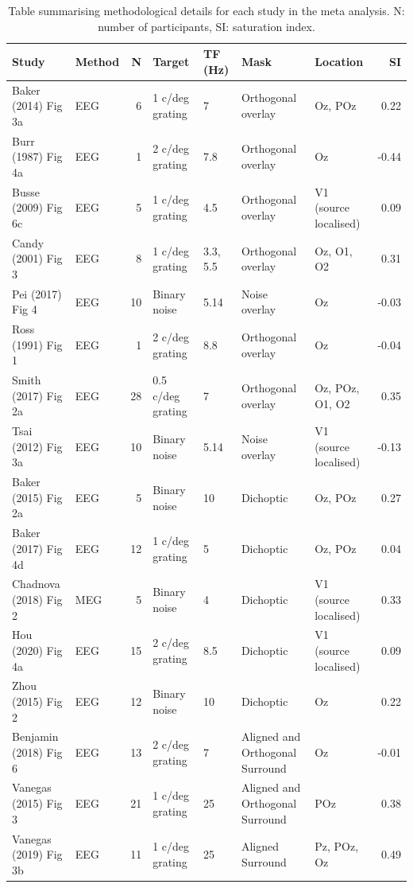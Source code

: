 \documentclass[]{article}
\begin{document}
\begin{table}

\caption{\label{tab:metatable}Table summarising methodological details for each study in the meta analysis. N: number of participants, SI: saturation index.}
\centering
\begin{tabular}[t]{l|l|r|l|l|l|l|r}
\hline
Study & Method & N & Target & TF (Hz) & Mask & Location & SI\\
\hline
Baker (2014) Fig 3a & EEG & 6 & 1 c/deg grating & 7 & Orthogonal overlay & Oz, POz & 0.22\\
\hline
Burr (1987) Fig 4a & EEG & 1 & 2 c/deg grating & 7.8 & Orthogonal overlay & Oz & -0.44\\
\hline
Busse (2009) Fig 6c & EEG & 5 & 1 c/deg grating & 4.5 & Orthogonal overlay & V1 (source localised) & 0.09\\
\hline
Candy (2001) Fig 3 & EEG & 8 & 1 c/deg grating & 3.3, 5.5 & Orthogonal overlay & Oz, O1, O2 & 0.31\\
\hline
Pei (2017) Fig 4 & EEG & 10 & Binary noise & 5.14 & Noise overlay & Oz & -0.03\\
\hline
Ross (1991) Fig 1 & EEG & 1 & 2 c/deg grating & 8.8 & Orthogonal overlay & Oz & -0.04\\
\hline
Smith (2017) Fig 2a & EEG & 28 & 0.5 c/deg grating & 7 & Orthogonal overlay & Oz, POz, O1, O2 & 0.35\\
\hline
Tsai (2012) Fig 3a & EEG & 10 & Binary noise & 5.14 & Noise overlay & V1 (source localised) & -0.13\\
\hline
Baker (2015) Fig 2a & EEG & 5 & Binary noise & 10 & Dichoptic & Oz, POz & 0.27\\
\hline
Baker (2017) Fig 4d & EEG & 12 & 1 c/deg grating & 5 & Dichoptic & Oz, POz & 0.04\\
\hline
Chadnova (2018) Fig 2 & MEG & 5 & Binary noise & 4 & Dichoptic & V1 (source localised) & 0.33\\
\hline
Hou (2020) Fig 4a & EEG & 15 & 2 c/deg grating & 8.5 & Dichoptic & V1 (source localised) & 0.09\\
\hline
Zhou (2015) Fig 2 & EEG & 12 & Binary noise & 10 & Dichoptic & Oz & 0.22\\
\hline
Benjamin (2018) Fig 6 & EEG & 13 & 2 c/deg grating & 7 & Aligned and Orthogonal Surround & Oz & -0.01\\
\hline
Vanegas (2015) Fig 3 & EEG & 21 & 1 c/deg grating & 25 & Aligned and Orthogonal Surround & POz & 0.38\\
\hline
Vanegas (2019) Fig 3b & EEG & 11 & 1 c/deg grating & 25 & Aligned Surround & Pz, POz, Oz & 0.49\\
\hline
\end{tabular}
\end{table}
\end{document}
